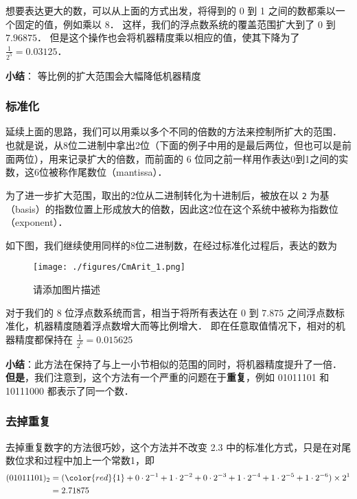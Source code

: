 想要表达更大的数，可以从上面的方式出发，将得到的 0 到 1 之间的数都乘以一个固定的值，例如乘以 8． 这样，我们的浮点数系统的覆盖范围扩大到了 $0$ 到 $7.96875$． 但是这个操作也会将机器精度乘以相应的值，使其下降为了  $\frac{1}{2^5}=0.03125$．

\textbf{小结}： 等比例的扩大范围会大幅降低机器精度

\subsubsection{标准化}

延续上面的思路，我们可以用乘以多个不同的倍数的方法来控制所扩大的范围． 也就是说，从8位二进制中拿出2位（下面的例子中用的是最后两位，但也可以是前面两位），用来记录扩大的倍数，而前面的 6 位同之前一样用作表达0到1之间的实数，这6位被称作尾数位（mantissa）． 

为了进一步扩大范围，取出的2位从二进制转化为十进制后，被放在以 \verb|2| 为基（basis）的指数位置上形成放大的倍数，因此这2位在这个系统中被称为指数位（exponent）．

如下图，我们继续使用同样的8位二进制数，在经过标准化过程后，表达的数为

\begin{figure}[ht]
\centering
\texttt{[image: ./figures/CmArit\_1.png]}
\caption{请添加图片描述} \label{CmArit_fig1}
\end{figure}

对于我们的 8 位浮点数系统而言，相当于将所有表达在 $0$ 到 $7.875$ 之间浮点数标准化，机器精度随着浮点数增大而等比例增大． 即在任意取值情况下，相对的机器精度都保持在 $\frac{1}{2^6}=0.015625$

\textbf{小结}：此方法在保持了与上一小节相似的范围的同时，将机器精度提升了一倍． \textbf{但是}，我们注意到，这个方法有一个严重的问题在于\textbf{重复}，例如 01011101 和 10111000 都表示了同一个数．

\subsubsection{去掉重复}

去掉重复数字的方法很巧妙，这个方法并不改变 2.3 中的标准化方式，只是在对尾数位求和过程中加上一个常数1，即
\begin{equation}
\begin{aligned}
(01011101)_2 &=({\color{red}{1}}+0\cdot2^{-1}+1\cdot2^{-2}+0\cdot2^{-3}+1\cdot2^{-4}+1\cdot2^{-5}+1\cdot2^{-6})\times2^1\\
&= 2.71875
\end{aligned}
\end{equation}

